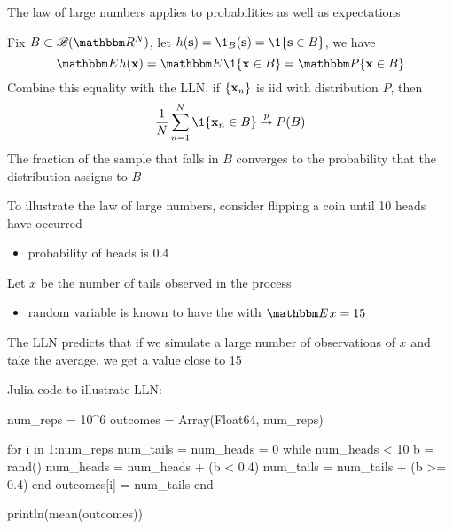 \begin{frame}

    \vspace{2em}
    The law of large numbers applies to probabilities as well as
    expectations
    
    \vspace{1em}
    Fix $B \subset \bB(\RR^N)$, let $h(\bolds) = \1_B(\bolds) = \1\{\bolds \in B\}$,
    we have
    \begin{equation*}
        \EE h(\boldx)  = \EE \1\{\boldx \in B\}  = \PP \{\boldx \in B\} 
    \end{equation*}
    Combine this equality with the LLN, 
    if $\{{\mathbf x}_n\}$ is {\sc iid} with distribution $P$, then
    \begin{equation*}
        \label{eq:lln0lg}
        \frac{1}{N} \sum_{n=1}^N \1\{\boldx_n \in B\} \toprob P(B)
    \end{equation*}
    The fraction of the sample that falls in $B$
    converges to the probability that the distribution assigns to $B$
    
\end{frame}

\begin{frame}

    \vspace{2em}
    To illustrate the law of large numbers, consider flipping a coin until
    10 heads have occurred
    
    \begin{itemize}
    \item probability of heads is
    0.4
    \end{itemize}
    
    \vspace{1em}
    Let $x$ be the number of tails observed in the process
    \begin{itemize}
        \item random variable is known to have the  with $\EE x =15$
    \end{itemize}
    
    The LLN predicts that 
    if we simulate a large number of observations of $x$ and take the average,
    we get a value close to 15

\end{frame}

\begin{frame}[fragile]

    \vspace{2em}
    Julia code to illustrate LLN:
    \begin{juliacode}
num_reps = 10^6
outcomes = Array(Float64, num_reps)

for i in 1:num_reps
    num_tails = num_heads = 0
    while num_heads < 10
        b = rand()
        num_heads = num_heads + (b < 0.4)   
        num_tails = num_tails + (b >= 0.4) 
    end
    outcomes[i] = num_tails
end

println(mean(outcomes))
    \end{juliacode}

\end{frame}


